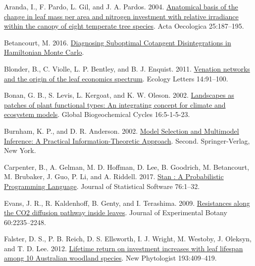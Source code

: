 \documentclass[
  12pt,
  a4paper,
,tablecaptionabove
]{scrartcl}
\newlength{\cslhangindent}
\newenvironment{CSLReferences}[2] %
 {%
  \setlength{\parindent}{0pt}
  \ifodd #1 \everypar{\setlength{\hangindent}{\cslhangindent}}\ignorespaces\fi
  \ifnum #2 > 0
  \setlength{\parskip}{#2\baselineskip}
  \fi
 }%
 {}
\begin{document}
\hypertarget{refs}{}
\begin{CSLReferences}{1}{0}
\leavevmode{}%
Aranda, I., F. Pardo, L. Gil, and J. A. Pardos. 2004.
\href{https://doi.org/10.1016/j.actao.2004.01.003}{Anatomical basis of
the change in leaf mass per area and nitrogen investment with relative
irradiance within the canopy of eight temperate tree species}. Acta
Oecologica 25:187--195.

\leavevmode{}%
Betancourt, M. 2016. \href{https://arxiv.org/abs/1604.00695}{Diagnosing
{Suboptimal Cotangent Disintegrations} in {Hamiltonian Monte Carlo}}.

\leavevmode{}%
Blonder, B., C. Violle, L. P. Bentley, and B. J. Enquist. 2011.
\href{https://doi.org/10.1111/j.1461-0248.2010.01554.x}{Venation
networks and the origin of the leaf economics spectrum}. Ecology Letters
14:91--100.

\leavevmode{}%
Bonan, G. B., S. Levis, L. Kergoat, and K. W. Oleson. 2002.
\href{https://doi.org/10.1029/2000GB001360}{Landscapes as patches of
plant functional types: {An} integrating concept for climate and
ecosystem models}. Global Biogeochemical Cycles 16:5-1-5-23.

\leavevmode{}%
Burnham, K. P., and D. R. Anderson. 2002.
\href{https://doi.org/10.1007/b97636}{Model {Selection} and {Multimodel
Inference}: {A Practical Information-Theoretic Approach}}. Second.
{Springer-Verlag}, {New York}.

\leavevmode{}%
Carpenter, B., A. Gelman, M. D. Hoffman, D. Lee, B. Goodrich, M.
Betancourt, M. Brubaker, J. Guo, P. Li, and A. Riddell. 2017.
\href{https://doi.org/10.18637/jss.v076.i01}{Stan : {A Probabilistic
Programming Language}}. Journal of Statistical Software 76:1--32.

\leavevmode{}%
Evans, J. R., R. Kaldenhoff, B. Genty, and I. Terashima. 2009.
\href{https://doi.org/10.1093/jxb/erp117}{Resistances along the {CO2}
diffusion pathway inside leaves}. Journal of Experimental Botany
60:2235--2248.

\leavevmode{}%
Falster, D. S., P. B. Reich, D. S. Ellsworth, I. J. Wright, M. Westoby,
J. Oleksyn, and T. D. Lee. 2012.
\href{https://doi.org/10.1111/j.1469-8137.2011.03940.x}{Lifetime return
on investment increases with leaf lifespan among 10 {Australian}
woodland species}. New Phytologist 193:409--419.


\end{CSLReferences}
\end{document}
